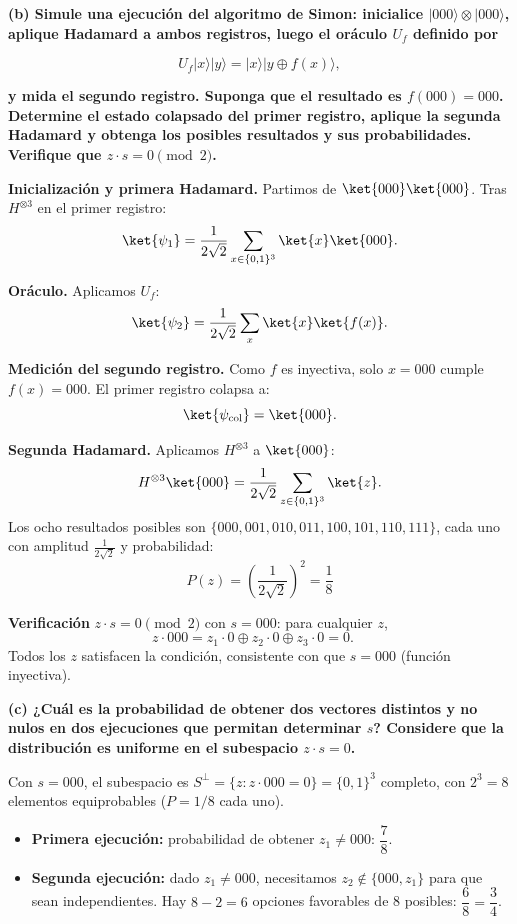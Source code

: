 {\bfseries (b) Simule una ejecución del algoritmo de Simon: inicialice $|000\rangle \otimes |000\rangle$, aplique Hadamard a ambos registros, luego el oráculo $U_f$ definido por}

$$
    U_f |x\rangle |y\rangle = |x\rangle |y \oplus f(x)\rangle,
$$

{\bfseries y mida el segundo registro. Suponga que el resultado es $f(000)=000$. Determine el estado colapsado del primer registro, aplique la segunda Hadamard y obtenga los posibles resultados y sus probabilidades. Verifique que $z \cdot s = 0 \pmod 2$.}

\textbf{Inicialización y primera Hadamard.} Partimos de $\ket{000}\ket{000}$. Tras $H^{\otimes 3}$ en el primer registro:
$$
    \ket{\psi_1} = \frac{1}{2\sqrt{2}} \sum_{x \in \{0,1\}^3} \ket{x}\ket{000}.
$$

\textbf{Oráculo.} Aplicamos $U_f$:
$$
    \ket{\psi_2} = \frac{1}{2\sqrt{2}} \sum_{x} \ket{x}\ket{f(x)}.
$$

\textbf{Medición del segundo registro.} Como $f$ es inyectiva, solo $x = 000$ cumple $f(x) = 000$. El primer registro colapsa a:
$$
    \ket{\psi_{\text{col}}} = \ket{000}.
$$

\textbf{Segunda Hadamard.} Aplicamos $H^{\otimes 3}$ a $\ket{000}$:
$$
    H^{\otimes 3}\ket{000} = \frac{1}{2\sqrt{2}} \sum_{z \in \{0,1\}^3} \ket{z}.
$$
Los ocho resultados posibles son $\{000, 001, 010, 011, 100, 101, 110, 111\}$, cada uno con amplitud $\frac{1}{2\sqrt{2}}$ y probabilidad:
$$
    P(z) = \left(\frac{1}{2\sqrt{2}}\right)^{\!2} = \frac{1}{8}
$$

\textbf{Verificación} $z \cdot s = 0 \pmod{2}$ con $s = 000$: para cualquier $z$,
$$
    z \cdot 000 = z_1 \cdot 0 \oplus z_2 \cdot 0 \oplus z_3 \cdot 0 = 0. \quad
$$
Todos los $z$ satisfacen la condición, consistente con que $s = 000$ (función inyectiva).

\vspace{0.5cm}

{\bfseries (c) ¿Cuál es la probabilidad de obtener dos vectores distintos y no nulos en dos ejecuciones que permitan determinar $s$? Considere que la distribución es uniforme en el subespacio $z \cdot s = 0$.}

Con $s = 000$, el subespacio es $S^\perp = \{z : z \cdot 000 = 0\} = \{0,1\}^3$ completo, con $2^3 = 8$ elementos equiprobables ($P = 1/8$ cada uno).

\begin{itemize}
    \item \textbf{Primera ejecución:} probabilidad de obtener $z_1 \neq 000$: $\dfrac{7}{8}$.
    \item \textbf{Segunda ejecución:} dado $z_1 \neq 000$, necesitamos $z_2 \notin \{000, z_1\}$ para que sean independientes. Hay $8 - 2 = 6$ opciones favorables de 8 posibles: $\dfrac{6}{8} = \dfrac{3}{4}$.
\end{itemize}

